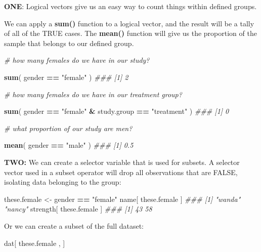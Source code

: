 \documentclass[]{book}
\newenvironment{Shaded}{\begin{snugshade}}{\end{snugshade}}
\newcommand{\CommentTok}[1]{\textcolor[rgb]{0.56,0.35,0.01}{\textit{#1}}}
\newcommand{\KeywordTok}[1]{\textcolor[rgb]{0.13,0.29,0.53}{\textbf{#1}}}
\newcommand{\NormalTok}[1]{#1}
\newcommand{\OperatorTok}[1]{\textcolor[rgb]{0.81,0.36,0.00}{\textbf{#1}}}
\newcommand{\StringTok}[1]{\textcolor[rgb]{0.31,0.60,0.02}{#1}}
\theoremstyle{definition}
\theoremstyle{definition}
\theoremstyle{definition}
\theoremstyle{remark}
\begin{document}
\textbf{ONE}: Logical vectors give us an easy way to count things within
defined groups.

We can apply a \textbf{sum()} function to a logical vector, and the
result will be a tally of all of the TRUE cases. The \textbf{mean()}
function will give us the proportion of the sample that belongs to our
defined group.

\begin{Shaded}
\begin{Highlighting}[]
\CommentTok{# how many females do we have in our study?}

\KeywordTok{sum}\NormalTok{( gender }\OperatorTok{==}\StringTok{ "female"}\NormalTok{ )}
\CommentTok{### [1] 2}

\CommentTok{# how many females do we have in our treatment group?}

\KeywordTok{sum}\NormalTok{( gender }\OperatorTok{==}\StringTok{ "female"} \OperatorTok{&}\StringTok{ }\NormalTok{study.group }\OperatorTok{==}\StringTok{ "treatment"}\NormalTok{ )}
\CommentTok{### [1] 0}

\CommentTok{# what proportion of our study are men? }

\KeywordTok{mean}\NormalTok{( gender }\OperatorTok{==}\StringTok{ "male"}\NormalTok{ )}
\CommentTok{### [1] 0.5}
\end{Highlighting}
\end{Shaded}

\textbf{TWO:} We can create a selector variable that is used for
subsets. A selector vector used in a subset operator will drop all
observations that are FALSE, isolating data belonging to the group:

\begin{Shaded}
\begin{Highlighting}[]
\NormalTok{these.female <-}\StringTok{ }\NormalTok{gender }\OperatorTok{==}\StringTok{ "female"}
\NormalTok{name[ these.female ]}
\CommentTok{### [1] "wanda" "nancy"}
\NormalTok{strength[ these.female ]}
\CommentTok{### [1] 43 58}
\end{Highlighting}
\end{Shaded}

Or we can create a subset of the full dataset:

\begin{Shaded}
\begin{Highlighting}[]
\NormalTok{dat[ these.female , ]}
\end{Highlighting}
\end{Shaded}
\end{document}
